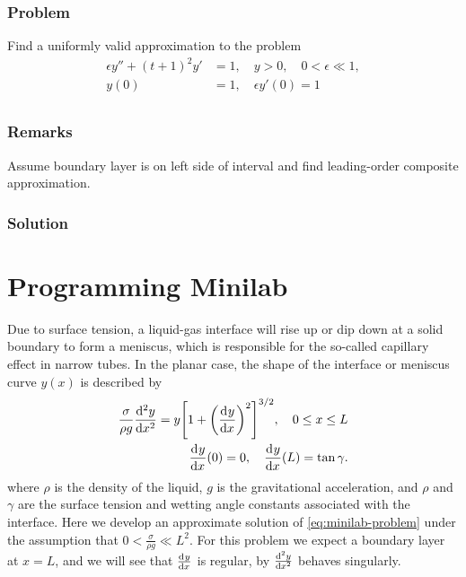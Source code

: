 \documentclass[12pt,twoside]{article}
\begin{document}
\subsubsection*{Problem}
Find a uniformly valid approximation to the problem
\begin{equation}
  \label{eq:3.4.3-problem}
  \begin{aligned}
    \epsilon y''+{(t+1)}^2y'&=1, \quad y>0,\quad 0<\epsilon\ll1,\\
    y(0)&=1, \quad \epsilon y'(0)=1 \\
  \end{aligned}
\end{equation}
\subsubsection*{Remarks}
Assume boundary layer is on left side of interval and find leading-order
composite approximation.
\subsubsection*{Solution}
\todo{}

\section{Programming Minilab}
Due to surface tension, a liquid-gas interface will rise up or dip down at a
solid boundary to form a meniscus, which is responsible for the so-called
capillary effect in narrow tubes. In the planar case, the shape of the interface
or meniscus curve $y(x)$ is described by
\begin{equation}
  \label{eq:minilab-problem}
  \begin{aligned}
    \frac{\sigma}{\rho g}\od[2]{y}{x} = y {\left[ 1 + {\left( \od{y}{x}
          \right)}^2 \right]}^{3/2},\quad 0\le x\le L \\
    \od{y}{x}(0) = 0,\quad \od{y}{x}(L) = \tan\gamma.
  \end{aligned}
\end{equation}
where $\rho$ is the density of the liquid, $g$ is the gravitational
acceleration, and $\rho$ and $\gamma$ are the surface tension and wetting angle
constants associated with the interface. Here we develop an approximate solution
of \cref{eq:minilab-problem} under the assumption that $0<\frac{\sigma}{\rho
  g}\ll L^2$. For this problem we expect a boundary layer at $x=L$, and we will
see that $\od{y}{x}$ is regular, by $\od[2]{y}{x}$ behaves singularly.
\end{document}
